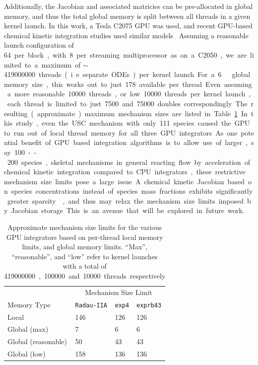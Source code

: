 \documentclass[preprint]{elsarticle}
\begin{document}
Additionally, the Jacobian and associated matricies can be pre-allocated in global memory, and thus the total global memory is split between all threads in a given kernel launch.
In this work, a Tesla C2075 GPU was used, and recent GPU-based chemical kinetic integration studies used similar models~\cite{Shi:2011aa,Niemeyer:2011aa,Shi:2012aa,Le2013596,Stone:2013aa,Niemeyer:2014aa}
Assuming a reasonable launch configuration of \SI{64} per block, with \SI{8} per streaming multiprocessor as on a C2050, we are limited to a maximum of $\sim$ \SI{419000000} threads (i.e. separate ODEs) per kernel launch.
For a \SI{6}{\giga\byte} global memory size, this works out to just \SI{178} available per thread.
Even assuming a more reasonable \SI{10000} threads, or low \SI{10000} threads per kernel launch, each thread is limited to just \SI{7500} and \SI{75000} doubles correspondingly.
The resulting (approximate) maximum mechanism sizes are listed in Table~\ref{T:size_limits}.

In this study, even the USC mechanism with only 111 species caused the GPU to run out of local thread memory for all three GPU integrators.
As one potential benefit of GPU based integration algorithms is to allow use of larger, say 100--200 species, skeletal mechanisms in general reacting flow by acceleration of chemical kinetic integration compared to CPU integrators, these restrictive mechanism size limits pose a large issue.
A chemical kinetic Jacobian based on species concentrations instead of species mass fractions exhibits significantly greater sparsity~\cite{Lu:2009gh}, and thus may relax the mechanism size limits imposed by Jacobian storage.
This is an avenue that will be explored in future work.

\begin{table}[tbp]
\centering
\begin{tabular}{@{}l l l l@{}}
 \toprule
& \multicolumn{3}{c}{Mechanism Size Limit} \\
Memory Type & \texttt{Radau-IIA} & \texttt{exp4} & \texttt{exprb43} \\
\midrule
Local	    & 146 & 126 & 126 \\

Global (max)	    & 7 & 6 & 6 \\
Global (reasonable) & 50 & 43 & 43 \\
Global (low) & 158 & 136 & 136 \\
\bottomrule
\end{tabular}
\caption{
Approximate mechanism size limits for the various GPU integrators based on per-thread local memory limits, and global memory limits.
``Max'', ``reasonable'', and ``low'' refer to kernel launches with a total of \SI{419000000}, \SI{100000} and \SI{10000} threads respectively
}
\label{T:size_limits}
\end{table}
\end{document}
